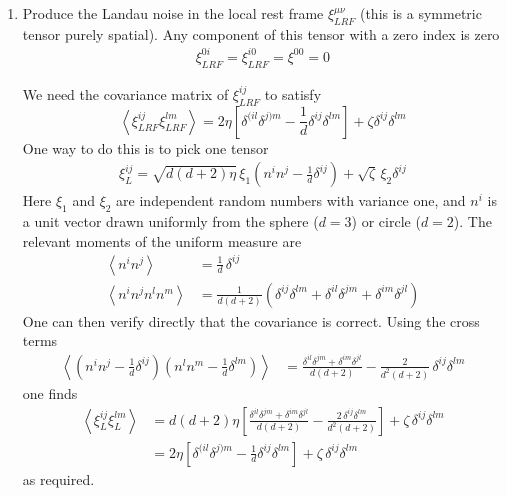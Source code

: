 \documentclass[12pt,aps,preprint,nofootinbib,noshowkeys,noshowpacs,longbibliography,superscriptaddress,tightenlines]{revtex4-2}
\def\llangle{\left\langle}
\def\rrangle{\right\rangle}
\begin{document}
\begin{enumerate}
\item Produce the Landau noise in the local rest frame  
$\xi^{\mu\nu}_{LRF} $ (this is a symmetric tensor purely spatial).  Any component of this tensor 
with a zero index is zero
\begin{align}
 \xi^{0i}_{LRF} = \xi^{i0}_{LRF} = \xi^{00} = 0
\end{align}

We need the covariance matrix of $\xi^{ij}_{LRF}$ to satisfy 
\begin{equation}
  \llangle \xi^{ij}_{LRF} \xi^{lm}_{LRF} \rrangle = 2 \eta \left[ \delta^{(il} \delta^{j)m}  -\frac{1}{d} \delta^{ij} \delta^{lm} \right]  + \zeta  \delta^{ij} \delta^{lm} 
\end{equation}
One way to do this is to pick one tensor
\begin{align}
\xi_{L}^{ij} = \sqrt{d (d + 2) \eta} \,  \xi_1 \left(n^i n^j - \tfrac{1}{d} \delta^{ij} \right)   +  \sqrt{\zeta} \, \xi_2 \delta^{ij} 
\end{align}
Here $\xi_1$ and $\xi_2$ are independent random numbers with variance one,
and $n^i$ is a unit vector drawn uniformly from the sphere ($d=3$) or circle ($d=2$).
The relevant moments of the uniform measure are
\begin{align}
  \llangle n^i n^j \rrangle &= \frac{1}{d}\,\delta^{ij} \\
  \llangle n^i n^j n^l n^m \rrangle &= \frac{1}{d(d+2)}\left(\delta^{ij}\delta^{lm} + \delta^{il}\delta^{jm} + \delta^{im}\delta^{jl}\right)
\end{align}
One can then verify directly that the covariance is correct.  Using the cross terms
\begin{align}
\llangle \left(n^i n^j - \tfrac{1}{d}\delta^{ij}\right)\!\left(n^l n^m - \tfrac{1}{d}\delta^{lm}\right)\rrangle
&= \frac{\delta^{il}\delta^{jm}+\delta^{im}\delta^{jl}}{d(d+2)}
  - \frac{2}{d^2(d+2)}\,\delta^{ij}\delta^{lm}
\end{align}
one finds
\begin{align}
\llangle \xi^{ij}_L \xi^{lm}_L \rrangle
&= d(d+2)\eta\left[\frac{\delta^{il}\delta^{jm}+\delta^{im}\delta^{jl}}{d(d+2)}
   - \frac{2\,\delta^{ij}\delta^{lm}}{d^2(d+2)}\right]
  + \zeta\,\delta^{ij}\delta^{lm} \nonumber\\
&= 2\eta\left[\delta^{(il}\delta^{j)m} - \frac{1}{d}\delta^{ij}\delta^{lm}\right]
  + \zeta\,\delta^{ij}\delta^{lm}
\end{align}
as required.



\end{enumerate}
\end{document}
